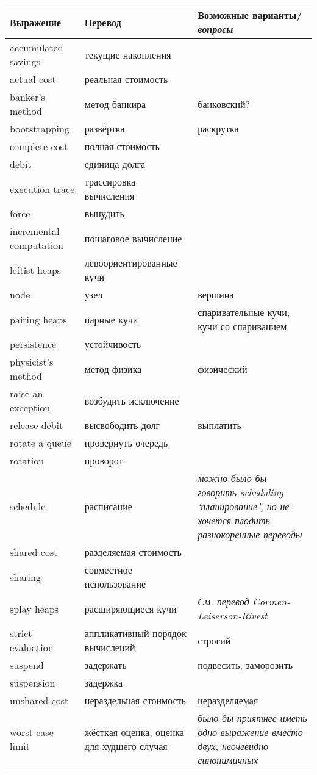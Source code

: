 \documentclass{article}
\begin{document}
\begin{tabular}{p{3cm}|p{4cm}|p{5cm}}
Выражение & Перевод & Возможные варианты/\textit{вопросы} \\
\hline
accumulated savings & текущие накопления \\
actual cost & реальная стоимость \\
banker's method & метод банкира & банковский? \\
bootstrapping & развёртка & раскрутка \\
complete cost & полная стоимость \\
debit & единица долга \\
execution trace & трассировка вычисления \\
force & вынудить \\
incremental computation & пошаговое вычисление \\
leftist heaps & левоориентированные кучи \\
node & узел & вершина \\
pairing heaps & парные кучи & спаривательные кучи, кучи со спариванием \\
persistence & устойчивость \\
physicist's method & метод физика & физический \\
raise an exception & возбудить исключение \\
release debit & высвободить долг & выплатить \\
rotate a queue & провернуть очередь \\
rotation & проворот \\
schedule & расписание & \textit{можно было бы говорить
  \emph{scheduling} `планирование', но не хочется плодить
  разнокоренные переводы} \\
shared cost & разделяемая стоимость \\
sharing & совместное использование \\
splay heaps & расширяющиеся кучи & \textit{См. перевод Cormen-Leiserson-Rivest}\\
strict evaluation & аппликативный порядок вычислений & строгий \\
suspend & задержать & подвесить, заморозить \\
suspension & задержка \\
unshared cost & нераздельная стоимость & неразделяемая \\
worst-case limit & жёсткая оценка, оценка для худшего случая &
\textit{было бы приятнее иметь одно выражение вместо двух, неочевидно
  синонимичных} \\
  
\end{tabular}
\end{document}
